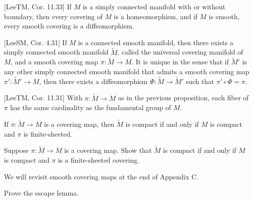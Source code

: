 \begin{corollary}
\label{cor:coverings-simply-connected}
[LeeTM, Cor. 11.33] If $M$ is a simply connected manifold with or without boundary, then every covering of $M$ is a homeomorphism, and if $M$ is smooth, every smooth covering is a diffeomorphism.
\end{corollary}

\begin{proposition}
\label{prop:universal-covering-manifold}
[LeeSM, Cor. 4.31] If $M$ is a connected smooth manifold, then there exists a simply connected smooth manifold $\tilde{M}$, called the universal covering manifold of $M$, and a smooth covering map $\pi: \tilde{M} \to M$. It is unique in the sense that if $\tilde{M}'$ is any other simply connected smooth manifold that admits a smooth covering map $\pi': \tilde{M}' \to M$, then there exists a diffeomorphism $\Phi: \tilde{M} \to \tilde{M}'$ such that $\pi' \circ \Phi = \pi$.
\end{proposition}

\begin{proposition}
\label{prop:fiber-cardinality-fundamental-group}

[LeeTM, Cor. 11.31] With $\pi: \tilde{M} \to M$ as in the previous proposition, each fiber of $\pi$ has the same cardinality as the fundamental group of $M$.
\end{proposition}

\begin{proposition}
\label{prop:compact-covering-finite-sheeted}
If $\pi:\tilde M\to M$ is a covering map, then $\tilde M$ is compact if and
only if $M$ is compact and $\pi$ is finite-sheeted.
\end{proposition}

\begin{exercise}
\label{exer:A.62}
Suppose $\pi: \tilde{M} \to M$ is a covering map. Show that $\tilde{M}$ is compact if and only if $M$ is compact and $\pi$ is a finite-sheeted covering.
\end{exercise}


We will revisit smooth covering maps at the end of Appendix C.

\begin{exercise}
\label{exer:A.44}
Prove the escape lemma.
\end{exercise}

